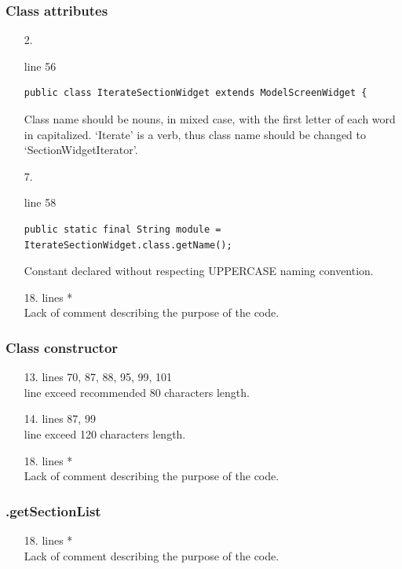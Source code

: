 \documentclass[english]{article}
\begin{document}
\subsubsection*{Class attributes }	
\begin{itemize}

\item[2.]{line 56
		\begin{lstlisting} 
public class IterateSectionWidget extends ModelScreenWidget {
		\end{lstlisting}
		Class name should be nouns, in mixed case, with the first letter of each word
in capitalized. `Iterate' is a verb, thus class name should be changed to `SectionWidgetIterator'.}

\item[7.]{line 58
		\begin{lstlisting} 
public static final String module = IterateSectionWidget.class.getName();
		\end{lstlisting}
		Constant declared without respecting UPPERCASE naming convention.}

		\item[18.]{lines  *\\
		Lack of comment describing the purpose of the code.}
\end{itemize}

\subsubsection*{Class constructor}	
\begin{itemize}
\item[13.]{lines 70, 87, 88, 95, 99, 101 \\
		line exceed recommended 80 characters length.}

\item[14.]{lines  87, 99\\
		line exceed 120 characters length.}
\item[18.]{lines  *\\
		Lack of comment describing the purpose of the code.}
\end{itemize}
	
\subsubsection*{.getSectionList}	
\begin{itemize}
\item[18.]{lines  *\\
		Lack of comment describing the purpose of the code.}
\end{itemize}
\end{document}
